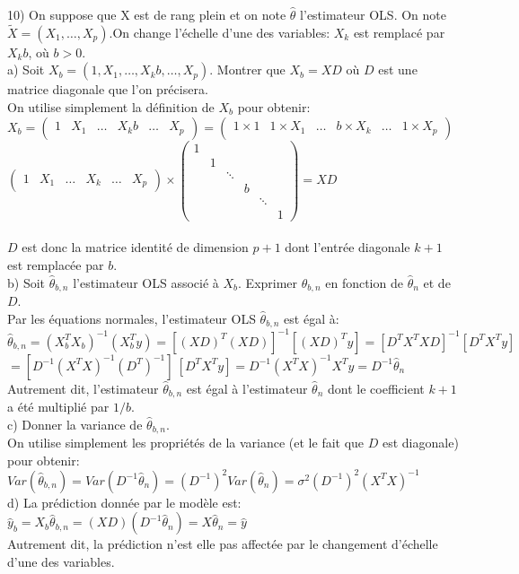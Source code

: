 10)  On suppose que X est de rang plein et on note $\hat{\theta}$ l’estimateur OLS. On note $\tilde{X}=(X_1,\hdots,X_p)$.On change l’échelle d’une des variables: $X_k$ est remplacé par $X_k b$, où $b>0$. \\
a) Soit $X_b=(1, X_1,\hdots, X_k b, \hdots, X_p)$. Montrer que $X_b = X D$ où $D$ est une matrice diagonale que l’on précisera. \\
On utilise simplement la définition de $X_b$ pour obtenir: \\
$X_b
= \left( \begin{matrix} 1 & X_1 & \hdots & X_k b & \hdots & X_p \end{matrix} \right)
= \left( \begin{matrix} 1 \times 1 & 1 \times X_1 & \hdots & b \times X_k & \hdots & 1 \times X_p \end{matrix} \right)$ \\
$ \left( \begin{matrix} 1 & X_1 & \hdots & X_k & \hdots & X_p \end{matrix} \right) \times
\left( \begin{matrix} 1 & & & & & \\ & 1 & & & & \\ & & \ddots & & & \\ & & & b & & \\ & & & & \ddots & \\ & & & & & 1 \end{matrix} \right)
= X D$ \\ \\
$D$ est donc la matrice identité de dimension $p+1$ dont l'entrée diagonale $k+1$ est remplacée par $b$. \\
b)  Soit $\hat{\theta}_{b,n}$ l’estimateur OLS associé à $X_b$. Exprimer $\hat{\theta}_{b,n}$ en fonction de $\hat{\theta}_{n}$ et de $D$. \\
Par les équations normales, l'estimateur OLS $\hat{\theta}_{b,n}$ est égal à: \\
$\hat{\theta}_{b,n}
=(X_b^T X_b)^{-1}(X_b^T y)
=[(X D)^T (X D)]^{-1}[(X D)^T y]
=[D^T X^T X D]^{-1}[D^T X^T y]$ \\
$=[D^{-1} (X^T X)^{-1} (D^T)^{-1}] \ [D^T X^T y]
=D^{-1} (X^T X)^{-1} X^T y
=D^{-1} \hat{\theta}_{n}$ \\
Autrement dit, l'estimateur $\hat{\theta}_{b,n}$ est égal à l'estimateur $\hat{\theta}_{n}$ dont le coefficient $k+1$ a été multiplié par $1/b$. \\
c) Donner la variance de $\hat{\theta}_{b,n}$. \\
On utilise simplement les propriétés de la variance (et le fait que $D$ est diagonale) pour obtenir: \\
$Var(\hat{\theta}_{b,n})=Var(D^{-1} \hat{\theta}_{n})=(D^{-1})^2 Var(\hat{\theta}_{n})=\sigma^2 (D^{-1})^2 (X^T X)^{-1}$ \\
d) La prédiction donnée par le modèle est: \\
$\hat{y}_b
=X_b \hat{\theta}_{b,n}
=(X D) (D^{-1} \hat{\theta}_{n})
=X \hat{\theta}_{n}
=\hat{y}$ \\
Autrement dit, la prédiction n'est elle pas affectée par le changement d'échelle d'une des variables. \vspace{2mm}

